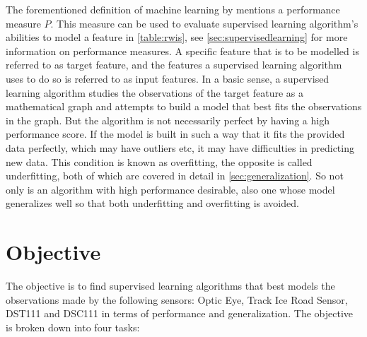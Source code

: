 	The forementioned definition of machine learning by \cite{BOOK:2} mentions a performance measure $P$. This measure can be used to evaluate supervised learning algorithm's abilities to model a feature in \ref{table:rwis}, see \ref{sec:supervisedlearning} for more information on performance measures. A specific feature that is to be modelled is referred to as target feature, and the features a supervised learning algorithm uses to do so is referred to as input features. In a basic sense, a supervised learning algorithm studies the observations of the target feature as a mathematical graph and attempts to build a model that best fits the observations in the graph. But the algorithm is not necessarily perfect by having a high performance score. If the model is built in such a way that it fits the provided data perfectly, which may have outliers etc, it may have difficulties in predicting new data. This condition is known as overfitting, the opposite is called underfitting, both of which are covered in detail in \ref{sec:generalization}. So not only is an algorithm with high performance desirable, also one whose model generalizes well so that both underfitting and overfitting is avoided.

\section{Objective} \label{sec:objective}
	The objective is to find supervised learning algorithms that best models the observations made by the following sensors: Optic Eye, Track Ice Road Sensor, DST111 and DSC111 in terms of performance and generalization. The objective is broken down into four tasks:
	

